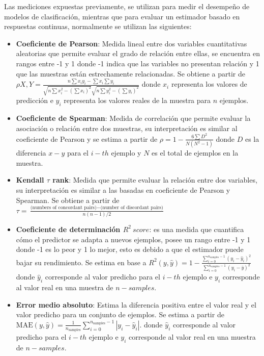 Las mediciones expuestas previamente, se utilizan para medir el desempeño de modelos de clasificación, mientras que para evaluar un estimador basado en respuestas continuas, normalmente se utilizan las siguientes:
	
\begin{itemize}
		
	\item \textbf{Coeficiente de Pearson}: Medida lineal entre dos variables cuantitativas aleatorias que permite evaluar el grado de relación entre ellas, se encuentra en rangos entre -1 y 1 donde -1 indica que las variables no presentan relación y 1 que las muestras están estrechamente relacionadas. Se obtiene a partir de $\rho X,Y= \frac{n\sum x_{i}y_{i} - \sum x_{i} \sum y_{i}}{\sqrt{n\sum x^{2}_{i}- (\sum x_{i})^{2}} \sqrt{n\sum y^{2}_{i}- (\sum y_{i})^{2}}}$ donde $x_{i}$ representa los valores de predicción e $y_{i}$ representa los valores reales de la muestra para $n$ ejemplos.
		
	\item \textbf{Coeficiente de Spearman}: Medida de correlación que permite evaluar la asociación o relación entre dos muestras, su interpretación es similar al coeficiente de Pearson y se estima a partir de $\rho = 1- \frac{6\sum D^{2}}{N(N^{2}-1)}$ donde $D$ es la diferencia $x-y$ para el $i-th$ ejemplo y $N$ es el total de ejemplos en la muestra.
		
	\item \textbf{Kendall $\tau$ rank}: Medida que permite evaluar la relación entre dos variables, su interpretación es similar a las basadas en coeficiente de Pearson y Spearman. Se obtiene a partir de $\tau = \frac{\text{(numbers of concordant pairs)} - \text{(number of discordant pairs)}}{n(n-1)/2}$
		
	\item \textbf{Coeficiente de determinación $R^{2}\ score$}: es una medida que cuantifica cómo el predictor se adapta a nuevos ejemplos, posee un rango entre -1 y 1 donde -1 es lo peor y 1 lo mejor, esto es debido a que el estimador puede bajar su rendimiento. Se estima en base a $R^2(y, \hat{y}) = 1 - \frac{\sum_{i=0}^{n_{\text{samples}} - 1} (y_i - \hat{y}_i)^2}{\sum_{i=0}^{n_\text{samples} - 1} (y_i - \bar{y})^2}$ donde $\hat{y}_i$ corresponde al valor predicho para el $i-th$ ejemplo e $y_{i}$ corresponde al valor real en una muestra de $n-samples$.
		
	\item \textbf{Error medio absoluto}: Estima la diferencia positiva entre el valor real y el valor predicho para un conjunto de ejemplos. Se estima a partir de $\text{MAE}(y, \hat{y}) = \frac{1}{n_{\text{samples}}} \sum_{i=0}^{n_{\text{samples}}-1} \left| y_i - \hat{y}_i \right|.$ donde $\hat{y}_i$ corresponde al valor predicho para el $i-th$ ejemplo e $y_{i}$ corresponde al valor real en una muestra de $n-samples$.
		

\end{itemize}
